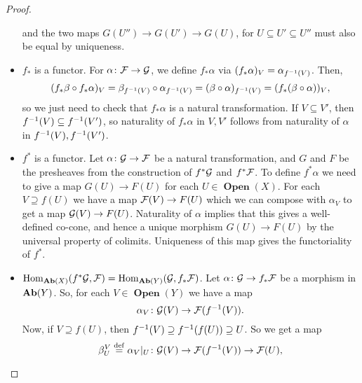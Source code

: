 \documentclass{article}
\DeclareMathOperator{\Open}{\mathbf{Open}}
\begin{document}
\begin{proof}
\begin{itemize}
              and the two maps $G(U'') \to G(U') \to G(U)$, for
              $U \subseteq U' \subseteq U''$ must also be
              equal by uniqueness.
        \item $f_*$ is a functor. For $\alpha \colon \mathcal{F} \to \mathcal{G}$,
              we define $f_*\alpha$ via $(f_*\alpha)_V = \alpha_{f^{-1}(V)}$.
              Then,
              \begin{equation*}
                  (f_*\beta \circ f_* \alpha)_V
                  = \beta_{f^{-1}(V)} \circ \alpha_{f^{-1}(V)}
                  = (\beta \circ \alpha)_{f^{-1}(V)}
                  = (f_*(\beta\circ \alpha))_V,
              \end{equation*}
              so we just need to check that $f_*\alpha$ is a natural
              transformation. If $V \subseteq V'$, then $f^{-1}(V) \subseteq f^{-1}(V')$,
              so naturality of $f_*\alpha$ in $V,V'$ follows from naturality
              of $\alpha$ in $f^{-1}(V), f^{-1}(V')$.
        \item $f^*$ is a functor. Let $\alpha\colon \mathcal{G} \to \mathcal{F}$
              be a natural transformation, and $G$ and $F$ be the presheaves
              from the construction of $f^*\mathcal{G}$ and $f^*\mathcal{F}$. To define
              $f^*\alpha$ we need to give a map $G(U) \to F(U)$ for each
              $U\in \Open(X)$. For each $V \supseteq f(U)$ we have a
              map $\mathcal{F}(V) \to F(U)$ which we can compose with $\alpha_V$
              to get a map $\mathcal{G}(V) \to F(U)$. Naturality of $\alpha$
              implies that this gives a well-defined co-cone, and hence a
              unique morphism $G(U) \to F(U)$ by the universal property
              of colimits. Uniqueness of this map gives the functoriality
              of $f^*$.
        \item $\operatorname{Hom}_{\operatorname{\mathbf{Ab}}(X)}(f^*\mathcal{G}, \mathcal{F}) = \operatorname{Hom}_{\operatorname{\mathbf{Ab}}(Y)}(\mathcal{G}, f_*\mathcal{F})$.
              Let $\alpha \colon \mathcal{G} \to f_*\mathcal{F}$ be a morphism in $\operatorname{\mathbf{Ab}}(Y)$.
              So, for each $V\in \Open(Y)$ we have a map
              \begin{equation*}
                  \alpha_V \colon \mathcal{G}(V) \to \mathcal{F}(f^{-1}(V)).
              \end{equation*}
              Now, if $V \supseteq f(U)$, then $f^{-1}(V) \supseteq f^{-1}(f(U)) \supseteq U$.
              So we get a map
              \begin{equation*}
                  \beta_U^V \overset{\mathrm{def}}{=} \alpha_V|_U \colon \mathcal{G}(V) \to\mathcal{F}(f^{-1}(V))\to \mathcal{F}(U),
              \end{equation*}

\end{itemize}
\end{proof}
\end{document}
